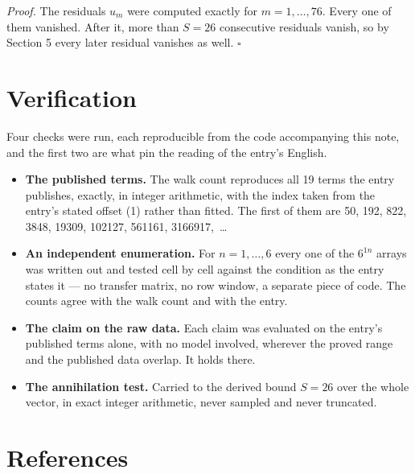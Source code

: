 \documentclass[11pt]{article}
\theoremstyle{definition}
\begin{document}
{\itshape Proof.} The residuals $u_m$ were computed exactly for $m = 1,\dots,76$. Every one of them vanished. After it, more than $S = 26$ consecutive residuals vanish, so by Section 5 every later residual vanishes as well. $\square$

\section{Verification}

Four checks were run, each reproducible from the code accompanying this note, and the first two are what pin the reading of the entry's English.

\begin{itemize}

\item {\bfseries The published terms.} The walk count reproduces all 19 terms the entry publishes, exactly, in integer arithmetic, with the index taken from the entry's stated offset (1) rather than fitted. The first of them are 50, 192, 822, 3848, 19309, 102127, 561161, 3166917,~\dots

\item {\bfseries An independent enumeration.} For $n = 1,\dots,6$ every one of the $6^{1n}$ arrays was written out and tested cell by cell against the condition as the entry states it --- no transfer matrix, no row window, a separate piece of code. The counts agree with the walk count and with the entry.

\item {\bfseries The claim on the raw data.} Each claim was evaluated on the entry's published terms alone, with no model involved, wherever the proved range and the published data overlap. It holds there.

\item {\bfseries The annihilation test.} Carried to the derived bound $S = 26$ over the whole vector, in exact integer arithmetic, never sampled and never truncated.

\end{itemize}

\section{References}
\end{document}
